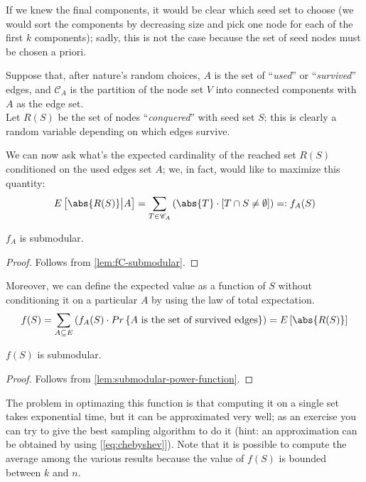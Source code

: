 If we knew the final components, it would be clear which seed set to choose (we would sort the components by decreasing size and pick one node for each of the first $k$ components); sadly, this is not the case because the set of seed nodes must be chosen a priori.

Suppose that, after nature's random choices, $A$ is the set of ``\textit{used}'' or ``\textit{survived}'' edges, and $\mathscr{C}_A$ is the partition of the node set $V$ into connected components with $A$ as the edge set.\\
Let $R(S)$ be the set of nodes ``\textit{conquered}'' with seed set $S$; this is clearly a random variable depending on which edges survive.

We can now ask what's the expected cardinality of the reached set $R(S)$ conditioned on the used edges set $A$; we, in fact, would like to maximize this quantity:
\begin{equation}
    E\left[\abs{R(S)} \big\rvert A\right] = \sum_{T \in \mathscr{C}_A}{\left( \abs{T} \cdot \left[ T \cap S \neq \emptyset \right] \right)} =: f_A(S)
\end{equation}

\begin{claim}
    $f_A$ is submodular. 
\end{claim}
\begin{proof}
    Follows from \cref{lem:fC-submodular}.
\end{proof}

Moreover, we can define the expected value as a function of $S$ without conditioning it on a particular $A$ by using the law of total expectation.
\begin{equation}\label{eq:sub-fs}
    f(S) = \sum_{A \subseteq E}\left( f_A(S) \cdot Pr\left\{ A \text{ is the set of survived edges} \right\} \right) = E\left[ \abs{R(S)} \right]
\end{equation}

\begin{claim}
    $f(S)$ is submodular.
\end{claim}
\begin{proof}
    Follows from \cref{lem:submodular-power-function}.
\end{proof}

The problem in optimazing this function is that computing it on a single set takes exponential time, but it can be approximated very well; as an exercise you can try to give the best sampling algorithm to do it (hint: an approximation can be obtained by using [\ref{eq:chebyshev}]). Note that it is possible to compute the average among the various results because the value of $f(S)$ is bounded between $k$ and $n$.

